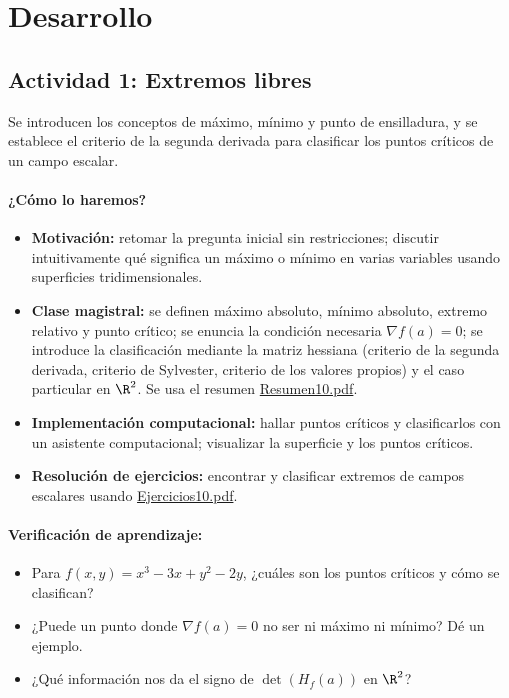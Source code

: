 \documentclass[a4,11pt]{aleph-notas}
\begin{document}
\section*{Desarrollo}

\subsection*{Actividad 1: Extremos libres}
Se introducen los conceptos de máximo, mínimo y punto de ensilladura, y se establece el criterio de la segunda derivada para clasificar los puntos críticos de un campo escalar.

\paragraph{¿Cómo lo haremos?}
\begin{itemize}[leftmargin=*]
    \item \textbf{Motivación:} retomar la pregunta inicial sin restricciones; discutir intuitivamente qué significa un máximo o mínimo en varias variables usando superficies tridimensionales.
    \item \textbf{Clase magistral:} se definen máximo absoluto, mínimo absoluto, extremo relativo y punto crítico; se enuncia la condición necesaria $\nabla f(a)=0$; se introduce la clasificación mediante la matriz hessiana (criterio de la segunda derivada, criterio de Sylvester, criterio de los valores propios) y el caso particular en $\R^2$. Se usa el resumen \href{https://andres-merino.github.io/MatematicaIII-05-N0051/01Resumen/Resumen10.pdf}{Resumen10.pdf}.
    \item \textbf{Implementación computacional:} hallar puntos críticos y clasificarlos con un asistente computacional; visualizar la superficie y los puntos críticos.
    \item \textbf{Resolución de ejercicios:} encontrar y clasificar extremos de campos escalares usando \href{https://andres-merino.github.io/MatematicaIII-05-N0051/04Ejercicios/Ejercicios10.pdf}{Ejercicios10.pdf}.
\end{itemize}

\paragraph{Verificación de aprendizaje:}
\begin{itemize}[leftmargin=*]
    \item Para $f(x,y)=x^3-3x+y^2-2y$, ¿cuáles son los puntos críticos y cómo se clasifican?
    \item ¿Puede un punto donde $\nabla f(a)=0$ no ser ni máximo ni mínimo? Dé un ejemplo.
    \item ¿Qué información nos da el signo de $\det(H_f(a))$ en $\R^2$?
\end{itemize}
\end{document}
